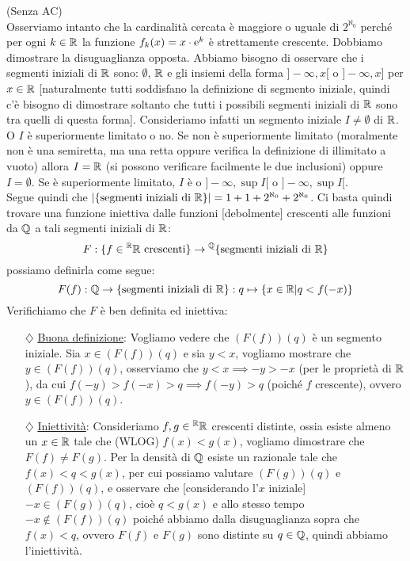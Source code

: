 \begin{soln}
	(Senza AC)\\
	Osserviamo intanto che la cardinalità cercata è maggiore o uguale di $2^{\aleph_0}$ perché per ogni $k \in \mathbb R$ la funzione $f_k(x) = x \cdot \text{e}^{k}$ è strettamente crescente. Dobbiamo dimostrare la disuguaglianza opposta.
	Abbiamo bisogno di osservare che i segmenti iniziali di $\mathbb R$ sono: $\emptyset$, $\mathbb R$ e gli insiemi della forma $]-\infty,x[$ o $]-\infty,x]$ per $x \in \mathbb R$ [naturalmente tutti soddisfano la definizione di segmento iniziale, quindi c'è bisogno di dimostrare soltanto che tutti i possibili segmenti iniziali di $\mathbb R$ sono tra quelli di questa forma].
	Consideriamo infatti un segmento iniziale $I \ne \emptyset$ di $\mathbb R$. O $I$ è superiormente limitato o no. Se non è superiormente limitato (moralmente non è una semiretta, ma una retta oppure verifica la definizione di illimitato a vuoto) allora $I = \mathbb R$ (si possono verificare facilmente le due inclusioni) oppure $I = \emptyset$. Se è superiormente limitato, $I$ è o $]-\infty,\sup I[$ o $]-\infty,\sup I[$.\\
	Segue quindi che $|\{\text{segmenti iniziali di $\mathbb R$}\}| = 1 + 1 + 2^{\aleph_0} + 2^{\aleph_0}$. Ci basta quindi trovare una funzione iniettiva dalle funzioni [debolmente] crescenti alle funzioni da $\mathbb Q$ a tali segmenti iniziali di $\mathbb R$:
	\[ F : \{\text{$f \in {}^\mathbb R \mathbb R$ crescenti}\} \to {}^\mathbb Q\{\text{segmenti iniziali di $\mathbb R$}\}
		\]
	possiamo definirla come segue:
	\[ F(f) : \mathbb Q \to \{\text{segmenti iniziali di $\mathbb R$}\} : q \mapsto \{x \in \mathbb R | q < f(-x)\}
		\]
	Verifichiamo che $F$ è ben definita ed iniettiva:
	\begin{itemize}
		\item[$\diamondsuit$] \underline{Buona definizione}: Vogliamo vedere che $(F(f))(q)$ è un segmento iniziale. Sia $x \in (F(f))(q)$ e sia $y < x$, vogliamo mostrare che $y \in (F(f))(q)$, osserviamo che $y < x \implies -y > -x$ (per le proprietà di $\mathbb R$), da cui $f(-y) > f(-x) > q \implies f(-y) > q$ (poiché $f$ crescente), ovvero $y \in (F(f))(q)$.
		\item[$\diamondsuit$] \underline{Iniettività}: Consideriamo $f,g \in {}^\mathbb R\mathbb R$ crescenti distinte, ossia esiste almeno un $x \in \mathbb R$ tale che (WLOG) $f(x) < g(x)$, vogliamo dimostrare che $F(f) \ne F(g)$. Per la densità di $\mathbb Q$ esiste un razionale tale che $f(x) < q < g(x)$, per cui possiamo valutare $(F(g))(q)$ e $(F(f))(q)$, e osservare che [considerando l'$x$ iniziale] $-x \in (F(g))(q)$, cioè $q < g(x)$ e allo stesso tempo $-x \not \in (F(f))(q)$ poiché abbiamo dalla disuguaglianza sopra che $f(x) < q$, ovvero $F(f)$ e $F(g)$ sono distinte su $q \in \mathbb Q$,
		quindi abbiamo l'iniettività.
	\end{itemize}
\end{soln}

